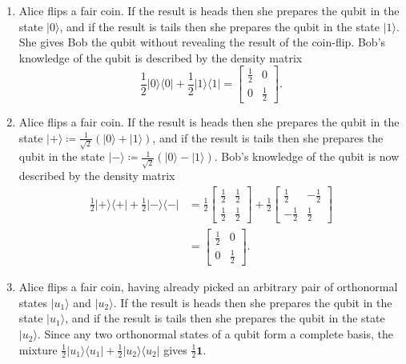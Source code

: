 \documentclass[fleqn]{article}
\begin{document}
\begin{enumerate}
\def\labelenumi{\arabic{enumi}.}
\item
  Alice flips a fair coin.
  If the result is heads then she prepares the qubit in the state \(|0\rangle\), and if the result is tails then she prepares the qubit in the state \(|1\rangle\).
  She gives Bob the qubit without revealing the result of the coin-flip.
  Bob's knowledge of the qubit is described by the density matrix
  \[
     \frac{1}{2}|0\rangle\langle 0| + \frac{1}{2}|1\rangle\langle 1|
     = \begin{bmatrix}
       \frac{1}{2} & 0
     \\0 & \frac{1}{2}
     \end{bmatrix}.
   \]
\item
  Alice flips a fair coin.
  If the result is heads then she prepares the qubit in the state \(|+\rangle\coloneqq\frac{1}{\sqrt{2}}(|0\rangle+|1\rangle)\), and if the result is tails then she prepares the qubit in the state \(|-\rangle\coloneqq\frac{1}{\sqrt{2}}(|0\rangle-|1\rangle)\).
  Bob's knowledge of the qubit is now described by the density matrix
  \[
     \begin{aligned}
       \frac{1}{2}|+\rangle\langle+| + \frac{1}{2}|-\rangle\langle-|
       &=
       \frac{1}{2}
       \begin{bmatrix}
       \frac{1}{2} & \frac{1}{2}
       \\\frac{1}{2} & \frac{1}{2}
       \end{bmatrix}
       +\frac{1}{2}
       \begin{bmatrix}
       \frac{1}{2} & -\frac{1}{2}
       \\-\frac{1}{2} & \frac{1}{2}
       \end{bmatrix}
     \\&=
       \begin{bmatrix}
       \frac{1}{2} & 0
       \\0 & \frac{1}{2}
       \end{bmatrix}.
     \end{aligned}
   \]
\item
  Alice flips a fair coin, having already picked an arbitrary pair of orthonormal states \(|u_1\rangle\) and \(|u_2\rangle\).
  If the result is heads then she prepares the qubit in the state \(|u_1\rangle\), and if the result is tails then she prepares the qubit in the state \(|u_2\rangle\).
  Since any two orthonormal states of a qubit form a complete basis, the mixture \(\frac{1}{2}|u_1\rangle\langle u_1|+\frac{1}{2}|u_2\rangle\langle u_2|\) gives \(\frac{1}{2}\mathbf{1}\).
\end{enumerate}
\end{document}

